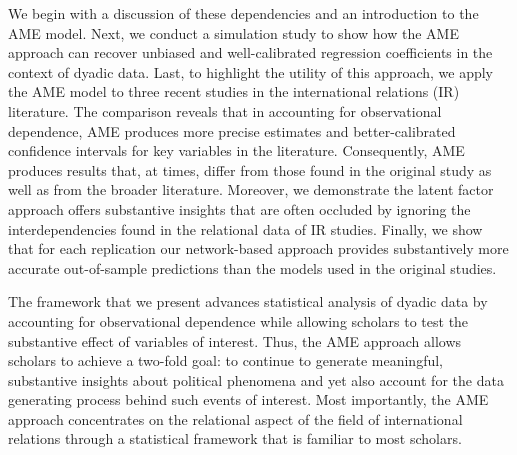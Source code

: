 We begin with a discussion of these dependencies and an introduction to the AME model. Next, we conduct a simulation study to show how the AME approach can recover unbiased and well-calibrated regression coefficients in the context of dyadic data. Last, to highlight the utility of this approach, we apply the AME model to three recent studies in the international relations (IR) literature. The comparison reveals that in accounting for observational dependence, AME produces more precise estimates and better-calibrated confidence intervals for key variables in the literature. Consequently, AME produces results that, at times, differ from those found in the original study as well as from the broader literature. Moreover, we demonstrate the latent factor approach offers substantive insights that are often occluded by ignoring the interdependencies found in the relational data of IR studies. Finally, we show that for each replication our network-based approach provides substantively more accurate out-of-sample predictions than the models used in the original studies. 

The framework that we present advances statistical analysis of dyadic data by accounting for observational dependence while allowing scholars to test the substantive effect of variables of interest. Thus, the AME approach allows scholars to achieve a two-fold goal: to continue to generate meaningful, substantive insights about political phenomena and yet also account for the data generating process behind such events of interest. Most importantly, the AME approach concentrates on the relational aspect of the field of international relations through a statistical framework that is familiar to most scholars.